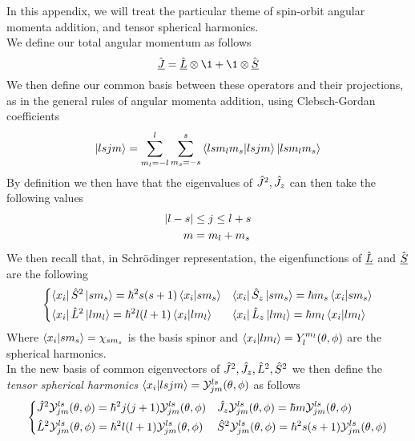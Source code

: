 \documentclass[../qm.tex]{subfiles}
\begin{document}
	In this appendix, we will treat the particular theme of spin-orbit angular momenta addition, and tensor spherical harmonics.\\
	We define our total angular momentum as follows
	\begin{equation}
		\vecopr{J}=\vecopr{L}\otimes\1+\1\otimes\vecopr{S}
		\label{eq:totalsoangmom}
	\end{equation}
	We then define our common basis between these operators and their projections, as in the general rules of angular momenta addition, using Clebsch-Gordan coefficients
	\begin{equation*}
		\ket{lsjm}=\sum_{m_l=-l}^l\sum_{m_s=-s}^s\bra{lsm_lm_s}\ket{lsjm}\ket{lsm_lm_s}
	\end{equation*}
By definition we then have that the eigenvalues of $\hat{J}^2,\hat{J}_z$ can then take the following values
	\begin{equation*}
		\begin{aligned}
			\abs{l-s}&\le j\le l+s\\
			m&=m_l+m_s
		\end{aligned}
	\end{equation*}
	We then recall that, in Schrödinger representation, the eigenfunctions of $\hat{\underline{L}}$ and $\hat{\underline{S}}$ are the following
	\begin{equation}
		\begin{dcases}
			\bra{x_i}\hat{S}^2\ket{sm_s}=\hbar^2s(s+1)\bra{x_i}\ket{sm_s}&\bra{x_i}\hat{S}_z\ket{sm_s}=\hbar m_s\bra{x_i}\ket{sm_s}\\
			\bra{x_i}\hat{L}^2\ket{lm_l}=\hbar^2l(l+1)\bra{x_i}\ket{lm_l}&\bra{x_i}\hat{L}_z\ket{lm_l}=\hbar m_l\bra{x_i}\ket{lm_l}
		\end{dcases}
		\label{eq:lseigen}
	\end{equation}
	Where $\bra{x_i}\ket{sm_s}=\chi_{sm_s}$ is the basis spinor and $\bra{x_i}\ket{lm_l}=Y^{m_l}_l(\theta,\phi)$ are the spherical harmonics.\\
	In the new basis of common eigenvectors of $\hat{J}^2,\hat{J}_z,\hat{L}^2,\hat{S}^2$ we then define the \textit{tensor spherical harmonics} $\bra{x_i}\ket{lsjm}=\mathcal{Y}^{ls}_{jm}(\theta,\phi)$ as follows
	\begin{equation}
		\begin{dcases}
			\hat{J}^2\mathcal{Y}^{ls}_{jm}(\theta,\phi)=\hbar^2j(j+1)\mathcal{Y}^{ls}_{jm}(\theta,\phi)&\hat{J}_z\mathcal{Y}^{ls}_{jm}(\theta,\phi)=\hbar m\mathcal{Y}^{ls}_{jm}(\theta,\phi)\\
			\hat{L}^2\mathcal{Y}^{ls}_{jm}(\theta,\phi)=\hbar^2l(l+1)\mathcal{Y}^{ls}_{jm}(\theta,\phi)&\hat{S}^2\mathcal{Y}^{ls}_{jm}(\theta,\phi)=\hbar^2s(s+1)\mathcal{Y}^{ls}_{jm}(\theta,\phi)
		\end{dcases}
		\label{eq:tsphaction}
	\end{equation}
\end{document}
